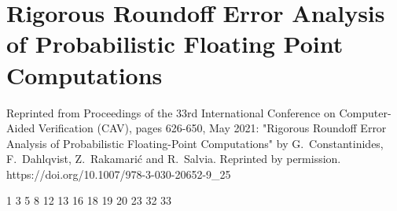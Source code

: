 
\chapter{Rigorous Roundoff Error Analysis of Probabilistic Floating Point Computations}
\label{sec:cav}
Reprinted from Proceedings of the 33rd International Conference on Computer-Aided Verification (CAV), pages 626-650, May 2021: "Rigorous Roundoff Error Analysis of Probabilistic Floating-Point Computations" by G.~Constantinides, F.~Dahlqvist, Z.~Rakamari\'c and R.~Salvia. Reprinted by permission.\\
https://doi.org/10.1007/978-3-030-20652-9\_25

\setupuuchapterbib

                              		{1}
					{3}
       								{5}
	{8}
						{12}
						{13}
       					{16}
										{18}
						{19}
										{20}
								{23}
						{32}
				{33}



%
%